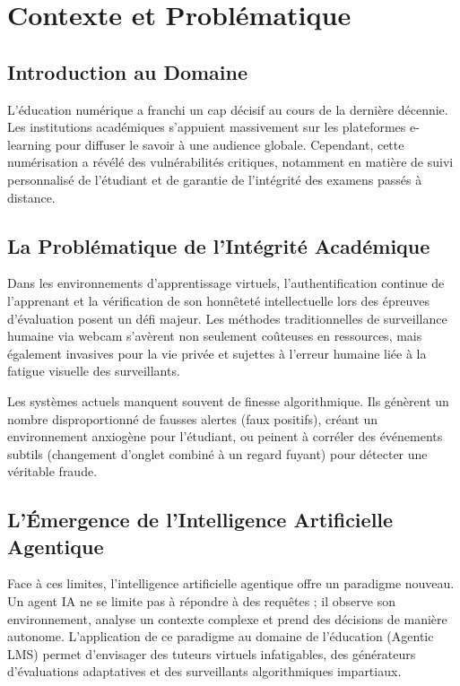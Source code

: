 \chapter{Contexte et Problématique}

\section{Introduction au Domaine}
L'éducation numérique a franchi un cap décisif au cours de la dernière décennie. Les institutions académiques s'appuient massivement sur les plateformes e-learning pour diffuser le savoir à une audience globale. Cependant, cette numérisation a révélé des vulnérabilités critiques, notamment en matière de suivi personnalisé de l'étudiant et de garantie de l'intégrité des examens passés à distance.

\section{La Problématique de l'Intégrité Académique}
Dans les environnements d'apprentissage virtuels, l'authentification continue de l'apprenant et la vérification de son honnêteté intellectuelle lors des épreuves d'évaluation posent un défi majeur. Les méthodes traditionnelles de surveillance humaine via webcam s'avèrent non seulement coûteuses en ressources, mais également invasives pour la vie privée et sujettes à l'erreur humaine liée à la fatigue visuelle des surveillants. 

\begin{infobox}
Les systèmes actuels manquent souvent de finesse algorithmique. Ils génèrent un nombre disproportionné de fausses alertes (faux positifs), créant un environnement anxiogène pour l'étudiant, ou peinent à corréler des événements subtils (changement d'onglet combiné à un regard fuyant) pour détecter une véritable fraude.
\end{infobox}

\section{L'Émergence de l'Intelligence Artificielle Agentique}
Face à ces limites, l'intelligence artificielle agentique offre un paradigme nouveau. Un agent IA ne se limite pas à répondre à des requêtes ; il observe son environnement, analyse un contexte complexe et prend des décisions de manière autonome. L'application de ce paradigme au domaine de l'éducation (Agentic LMS) permet d'envisager des tuteurs virtuels infatigables, des générateurs d'évaluations adaptatives et des surveillants algorithmiques impartiaux.

